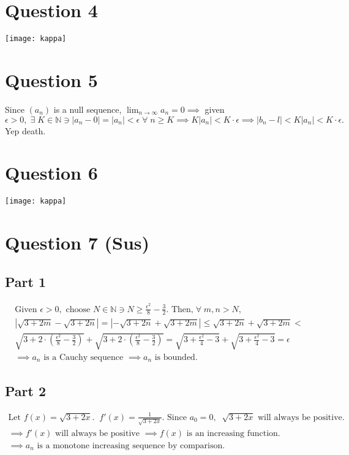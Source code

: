 \documentclass[12pt, a4paper]{article}
\newcommand{\ex}{\; \exists \;}
\newcommand{\nat}{\mathbb{N}}
\newcommand{\all}{\; \forall \;}
\newcommand{\brom}{\sqrt{3+2m}}
\newcommand{\bron}{\sqrt{3+2n}}
\begin{document}
\section{Question 4}
\texttt{[image: kappa]}

\section{Question 5}
Since $(a_n)$ is a null sequence, $\lim_{n \to \infty} a_n = 0 \implies
$ given $ \epsilon > 0, \ex K \in \nat \ni |a_n - 0| = |a_n| < \epsilon 
\all n \geq K \implies K |a_n| < K \cdot \epsilon \implies 
|b_n - l| < K|a_n| < K \cdot \epsilon. $ Yep death.

\section{Question 6}
\texttt{[image: kappa]}

\section{Question 7 (Sus)}

\subsection{Part 1}
\begin{gather*}
  \text{Given } \epsilon > 0, \text{ choose }
  N \in \nat \ni N \geq \frac{\epsilon^2}{8} - \frac{3}{2}. \text{ Then,}
  \all m, n > N,\\[5pt] 
  | \brom - \bron | = | -\bron + \brom | \leq \bron + \brom < \\[5pt]
  \sqrt{3 + 2 \cdot (\frac{\epsilon^2}{8} - \frac{3}{2})} 
  + \sqrt{3 + 2 \cdot (\frac{\epsilon^2}{8} - \frac{3}{2})} =
  \sqrt{3 + \frac{\epsilon^2}{4} - 3} + \sqrt{3 + \frac{\epsilon^2}{4} - 3} = \epsilon \\[5pt]
  \implies a_n \text{ is a Cauchy sequence } \implies a_n \text{ is bounded.}
\end{gather*}

\subsection{Part 2}
\begin{gather*}
  \text{Let } f(x) = \sqrt{3 + 2x}. \; \; f'(x) = \frac{1}{\sqrt{3 + 2x}}.
  \text{ Since } a_0 = 0, \;\; \sqrt{3 + 2x} \text{ will always be positive.} \\[5pt]
  \implies f'(x) \text{ will always be positive } \implies f(x) \text{ is an increasing function. } \\[5pt]
  \implies a_n \text{ is a monotone increasing sequence by comparison.}
\end{gather*}
\end{document}
